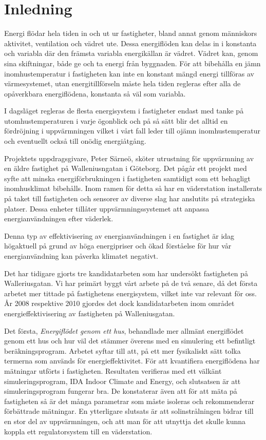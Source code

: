 \chapter{Inledning}

Energi flödar hela tiden in och ut ur fastigheter, bland annat genom människors aktivitet, ventilation och vädret ute. Dessa energiflöden kan delas in i konstanta och variabla där den främsta variabla energikällan är vädret. Vädret kan, genom sina skiftningar, både ge och ta energi från byggnaden. För att bibehålla en jämn inomhustemperatur i fastigheten kan inte en konstant mängd energi tillföras av värmesystemet, utan energitillförseln måste hela tiden regleras efter alla de opåverkbara energiflödena, konstanta så väl som variabla.

I dagsläget regleras de flesta energisystem i fastigheter endast med tanke på utomhustemperaturen i varje ögonblick och på så sätt blir det alltid en fördröjning i uppvärmningen vilket i vårt fall leder till ojämn inomhustemperatur och eventuellt också till onödig energiåtgång.

Projektets uppdragsgivare, Peter Särneö, sköter utrustning för uppvärmning av en äldre fastighet på Walleniusngatan i Göteborg. Det pågår ett projekt med syfte att minska energiförbrukningen i fastigheten samtidigt som ett behagligt inomhusklimat bibehålls. Inom ramen för detta så har en väderstation installerats på taket till fastigheten och sensorer av diverse slag har anslutits på strategiska platser.
 Dessa enheter tillåter uppvärmningssystemet att anpassa energianvändningen efter väderlek. %

Denna typ av effektivisering av energianvändningen i en fastighet är idag högaktuell på grund av höga energipriser och ökad förståelse för hur vår energianvändning kan påverka klimatet negativt.

Det har tidigare gjorts tre kandidatarbeten som har undersökt fastigheten på Walleriusgatan. Vi har primärt byggt vårt arbete på de två senare, då det första arbetet mer tittade på fastighetens energisystem, vilket inte var relevant för oss. År 2008 respektive 2010 gjordes det dock kandidatarbeten inom området energieffektivisering av fastigheten på Walleniusgatan. 

Det första, \textit{Energiflödet genom ett hus}\cite{kandidatarbete2008},
behandlade mer allmänt energiflödet genom ett hus och hur väl det stämmer
överens med en simulering ett befintligt beräkningsprogram. Arbetet syftar
till att, på ett mer fysikaliskt sätt tolka termerna som används för
energieffektivitet. För att kvantifiera energiflödena har mätningar utförts i
fastigheten. Resultaten verifieras med ett välkänt simuleringsprogram,
IDA Indoor Climate and Energy, och slutsatsen är att simuleringsprogram fungerar bra.
De konstaterar även att för att mäta på fastigheten så är det många parametrar som
måste isoleras och rekommenderar förbättrade mätningar.
 En ytterligare slutsats är att solinstrålningen bidrar till en stor del av
uppvärmningen, och att man för att utnyttja det skulle kunna koppla ett
regulatorsystem till en väderstation.

